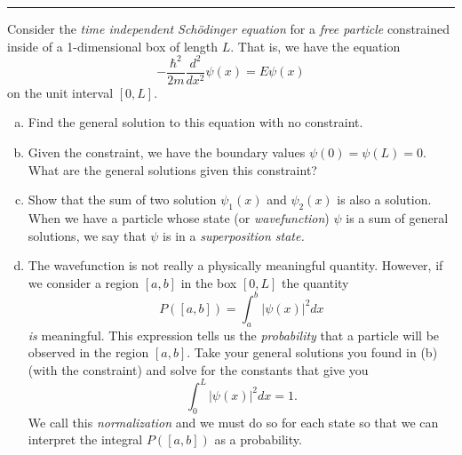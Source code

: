 \documentclass[12pt]{article} %
\begin{document}
\hrule
\begin{problem}
Consider the \emph{time independent Sch\"odinger equation} for a \emph{free particle} constrained inside of a 1-dimensional box of length $L$. That is, we have the equation
\[
-\frac{\hbar^2}{2m}\frac{d^2}{dx^2}\psi(x)=E\psi(x)
\]
on the unit interval $[0,L]$.
\begin{enumerate}[(a)]
    \item Find the general solution to this equation with no constraint.
    \item Given the constraint, we have the boundary values $\psi(0)=\psi(L)=0$. What are the general solutions given this constraint?
    \item Show that the sum of two solution $\psi_1(x)$ and $\psi_2(x)$ is also a solution. When we have a particle whose state (or \emph{wavefunction}) $\psi$ is a sum of general solutions, we say that $\psi$ is in a \emph{superposition state.}
    \item The wavefunction is not really a physically meaningful quantity.  However, if we consider a region $[a,b]$ in the box $[0,L]$ the quantity
    \[
    P([a,b])=\int_a^b |\psi(x)|^2dx
    \]
    \emph{is} meaningful. This expression tells us the \emph{probability} that a particle will be observed in the region $[a,b]$.  Take your general solutions you found in (b) (with the constraint) and solve for the constants that give you
    \[
    \int_0^L |\psi(x)|^2dx=1.
    \]
    We call this \emph{normalization} and we must do so for each state so that we can interpret the integral $P([a,b])$ as a probability.
\end{enumerate}
\end{problem}
\end{document}
